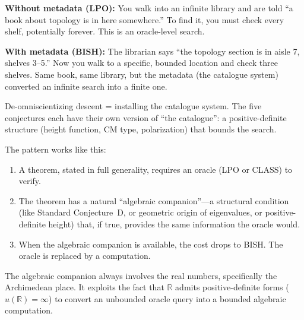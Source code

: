 \documentclass[11pt,twoside,openany]{report}
\theoremstyle{remark}
\newcommand{\BISH}{\textsf{BISH}}
\newcommand{\LPO}{\textsf{LPO}}
\newcommand{\CLASS}{\textsf{CLASS}}
\begin{document}
\begin{analogybox}
\textbf{Without metadata (LPO):} You walk into an infinite library and are told ``a book about topology is in here somewhere.'' To find it, you must check every shelf, potentially forever. This is an oracle-level search.

\textbf{With metadata (BISH):} The librarian says ``the topology section is in aisle 7, shelves 3--5.'' Now you walk to a specific, bounded location and check three shelves. Same book, same library, but the metadata (the catalogue system) converted an infinite search into a finite one.

De-omniscientizing descent = installing the catalogue system. The five conjectures each have their own version of ``the catalogue'': a positive-definite structure (height function, CM type, polarization) that bounds the search.
\end{analogybox}

The pattern works like this:

\begin{enumerate}
  \item A theorem, stated in full generality, requires an oracle (\LPO{} or \CLASS) to verify.
  \item The theorem has a natural ``algebraic companion''---a structural condition (like Standard Conjecture~D, or geometric origin of eigenvalues, or positive-definite height) that, if true, provides the same information the oracle would.
  \item When the algebraic companion is available, the cost drops to \BISH. The oracle is replaced by a computation.
\end{enumerate}

The algebraic companion always involves the real numbers, specifically the Archimedean place. It exploits the fact that $\mathbb{R}$ admits positive-definite forms ($u(\mathbb{R}) = \infty$) to convert an unbounded oracle query into a bounded algebraic computation.
\end{document}

